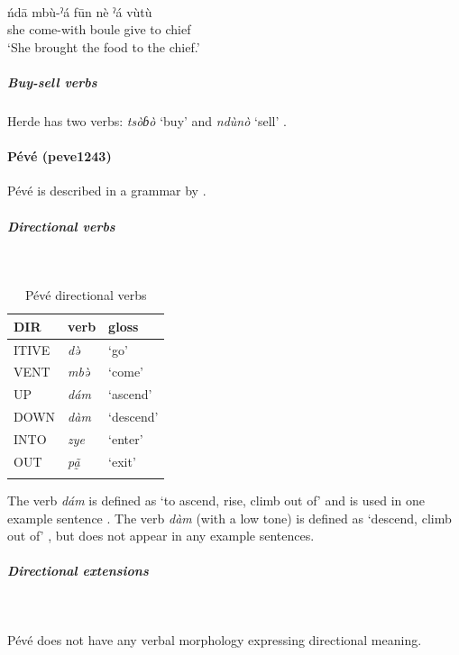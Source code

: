 \ea\label{ex2:herd3}
 \\
\gll  ńdā mbù-ˀá fūn nè ˀá vùtù \\
she come-with boule give to chief  \\
\glt `She brought the food to the chief.' 
\z

\subparagraph{Buy-sell verbs}

Herde has two verbs: \textit{tsòɓò} `buy' and \textit{ndùnò} `sell' \citep[373, 401]{sachnineLame1982}. 

\newpage
\paragraph*{Pévé (peve1243)} \label{peve}

Pévé is described in a grammar by \citet{shayGrammarPeve2020}. 

\subparagraph{Directional verbs}~

\begin{table}[H]
	\caption{Pévé directional verbs} 
	\label{tab:peveV}
	\begin{tabular}{lll} %
		\lsptoprule
		DIR & verb & gloss   \\ %
		\midrule
		ITIVE & \textit{də̀} & `go' \\
		VENT & \textit{mbə̀} & `come' \\
		UP & \textit{dám} & `ascend' \\
		DOWN & \textit{dàm} & `descend' \\
		INTO & \textit{zye} & `enter' \\
		OUT & \textit{pã̰} & `exit' \\
		\lspbottomrule
	\end{tabular}
\end{table}

The verb \textit{dám} is defined as `to ascend, rise, climb out of' \citep[333, 350]{shayGrammarPeve2020} and is used in one example sentence \citep[145]{shayGrammarPeve2020}. The verb \textit{dàm} (with a low tone) is defined as `descend, climb out of' \citep[346]{shayGrammarPeve2020}, but does not appear in any example sentences. 

\subparagraph{Directional extensions}~

Pévé does not have any verbal morphology expressing directional meaning.

